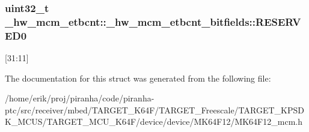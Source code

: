 \subsubsection[{\texorpdfstring{R\+E\+S\+E\+R\+V\+E\+D0}{RESERVED0}}]{\setlength{\rightskip}{0pt plus 5cm}uint32\+\_\+t \+\_\+hw\+\_\+mcm\+\_\+etbcnt\+::\+\_\+hw\+\_\+mcm\+\_\+etbcnt\+\_\+bitfields\+::\+R\+E\+S\+E\+R\+V\+E\+D0}\hypertarget{struct__hw__mcm__etbcnt_1_1__hw__mcm__etbcnt__bitfields_a5b73c7f91a1d60fb9163d73b0902ac7b}{}\label{struct__hw__mcm__etbcnt_1_1__hw__mcm__etbcnt__bitfields_a5b73c7f91a1d60fb9163d73b0902ac7b}
\mbox{[}31\+:11\mbox{]} 

The documentation for this struct was generated from the following file\+:\begin{DoxyCompactItemize}
\item 
/home/erik/proj/piranha/code/piranha-\/ptc/src/receiver/mbed/\+T\+A\+R\+G\+E\+T\+\_\+\+K64\+F/\+T\+A\+R\+G\+E\+T\+\_\+\+Freescale/\+T\+A\+R\+G\+E\+T\+\_\+\+K\+P\+S\+D\+K\+\_\+\+M\+C\+U\+S/\+T\+A\+R\+G\+E\+T\+\_\+\+M\+C\+U\+\_\+\+K64\+F/device/device/\+M\+K64\+F12/M\+K64\+F12\+\_\+mcm.\+h\end{DoxyCompactItemize}
